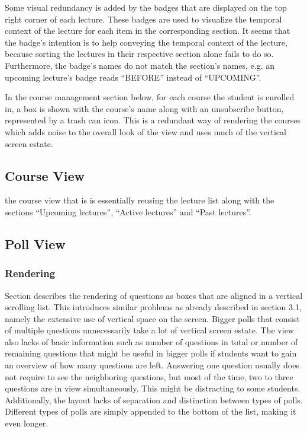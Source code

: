 Some visual redundancy is added by the badges that are displayed on the top right corner of each lecture. These badges are used to visualize the temporal context of the lecture for each item in the corresponding section. It seems that the badge's intention is to help conveying the temporal context of the lecture, because sorting the lectures in their respective section alone fails to do so. Furthermore, the badge's names do not match the section's names, e.g. an upcoming lecture's badge reads “BEFORE” instead of “UPCOMING”. 

In the course management section below, for each course the student is enrolled in, a box is shown with the course's name along with an unsubscribe button, represented by a trash can icon.
\todogrf
This is a redundant way of rendering the courses which adds noise to the overall look of the view and uses much of the vertical screen estate.

\subsection{Course View}
the course view that is is essentially reusing the lecture list along with the sections “Upcoming lectures”, “Active lectures” and “Past lectures”.

\todogrf

\subsection{Poll View}

\subsubsection{Rendering}

Section \todosct describes the rendering of questions as boxes that are aligned in a vertical scrolling list. This introduces similar problems as already described in section 3.1, namely the extensive use of vertical space on the screen. Bigger polls that consist of multiple questions unnecessarily take a lot of vertical screen estate. The view also lacks of basic information such as number of questions in total or number of remaining questions that might be useful in bigger polls if students want to gain an overview of how many questions are left.
Answering one question usually does not require to see the neighboring questions, but most of the time, two to three questions are in view simultaneously. This might be distracting to some students.
Additionally, the layout lacks of separation and distinction between types of polls.
Different types of polls are simply appended to the bottom of the list, making it even longer.

